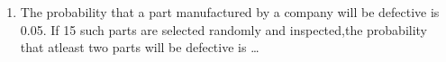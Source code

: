 \renewcommand{\theequation}{\theenumi}
\renewcommand{\thefigure}{\theenumi}
\renewcommand{\thetable}{\theenumi}
\begin{enumerate}[label=\thesection.\arabic*.,ref=\thesection.\theenumi]

\item The probability that a part manufactured by a company will be defective is 0.05. If 15 such parts are selected randomly and inspected,the probability that atleast two parts will be defective is \dots
%

\solution
%



\end{enumerate}